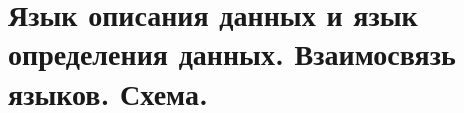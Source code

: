 {
	\section{Язык описания данных и язык определения данных. Взаимосвязь языков. Схема.}
	\newpage
}
